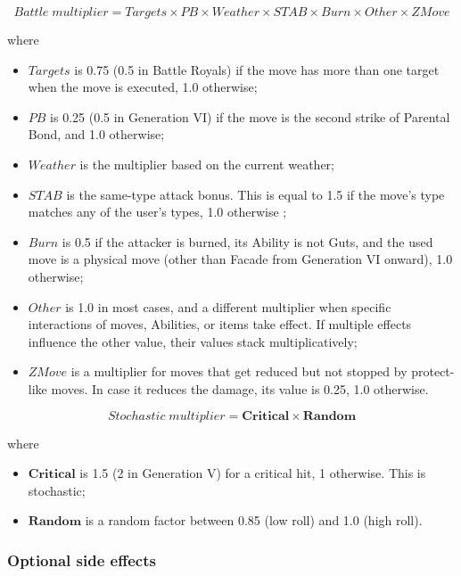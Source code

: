 \documentclass{article}
\begin{document}
\begin{equation}
    Battle \; multiplier = Targets \times PB \times Weather \times STAB \times Burn \times Other \times ZMove
\end{equation}

where

\begin{itemize}
    \item $Targets$ is 0.75 (0.5 in Battle Royals) if the move has more than one target when the move is executed, 1.0 otherwise;
    \item $PB$ is 0.25 (0.5 in Generation VI) if the move is the second strike of Parental Bond, and 1.0 otherwise;
    \item $Weather$ is the multiplier based on the current weather;
    \item $STAB$ is the same-type attack bonus. This is equal to 1.5 if the move's type matches any of the user's types, 1.0 otherwise ;
    \item $Burn$ is 0.5 if the attacker is burned, its Ability is not Guts, and the used move is a physical move (other than Facade from Generation VI onward), 1.0 otherwise;
    \item $Other$ is 1.0 in most cases, and a different multiplier when specific interactions of moves, Abilities, or items take effect. If multiple effects influence the other value, their values stack multiplicatively;
    \item $ZMove$ is a multiplier for moves that get reduced but not stopped by protect-like moves. In case it reduces the damage, its value is 0.25, 1.0 otherwise.
\end{itemize}

\begin{equation}
    Stochastic \; multiplier = \textbf{Critical} \times \textbf{Random}
\end{equation}

where

\begin{itemize}
    \item $\textbf{Critical}$ is 1.5 (2 in Generation V) for a critical hit, 1 otherwise. This is stochastic;
    \item $\textbf{Random}$ is a random factor between 0.85 (low roll) and 1.0 (high roll).
\end{itemize}

\subsubsection{Optional side effects}
\end{document}
